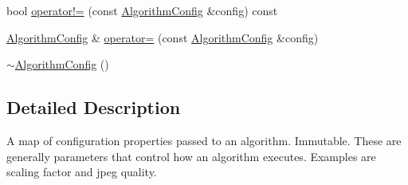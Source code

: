 \begin{DoxyCompactItemize}
\item 
bool \hyperlink{classBUSBOY_1_1AlgorithmConfig_a8c537a1b7a0885932b52e962343e91de}{operator!=} (const \hyperlink{classBUSBOY_1_1AlgorithmConfig}{AlgorithmConfig} \&config) const 
\item 
\hyperlink{classBUSBOY_1_1AlgorithmConfig}{AlgorithmConfig} \& \hyperlink{classBUSBOY_1_1AlgorithmConfig_a31e47fcab6cce0c194bb5615de5e770d}{operator=} (const \hyperlink{classBUSBOY_1_1AlgorithmConfig}{AlgorithmConfig} \&config)
\item 
\hyperlink{classBUSBOY_1_1AlgorithmConfig_ad515c07281984d56af000ab0e9359e76}{$\sim$AlgorithmConfig} ()
\end{DoxyCompactItemize}


\subsection{Detailed Description}
A map of configuration properties passed to an algorithm. Immutable. These are generally parameters that control how an algorithm executes. Examples are scaling factor and jpeg quality. 

